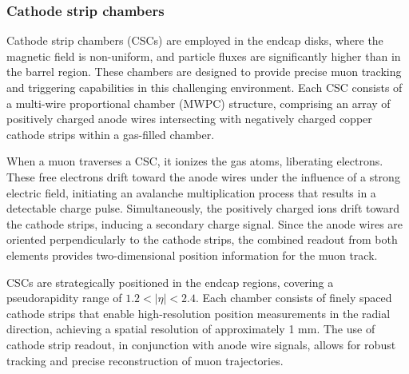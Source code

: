 
\subsubsection{Cathode strip chambers}

Cathode strip chambers (CSCs) are employed in the endcap disks, where the magnetic field is non-uniform, and particle fluxes are significantly higher than in the barrel region. These chambers are designed to provide precise muon tracking and triggering capabilities in this challenging environment. Each CSC consists of a multi-wire proportional chamber (MWPC) structure, comprising an array of positively charged anode wires intersecting with negatively charged copper cathode strips within a gas-filled chamber.

When a muon traverses a CSC, it ionizes the gas atoms, liberating electrons. These free electrons drift toward the anode wires under the influence of a strong electric field, initiating an avalanche multiplication process that results in a detectable charge pulse. Simultaneously, the positively charged ions drift toward the cathode strips, inducing a secondary charge signal. Since the anode wires are oriented perpendicularly to the cathode strips, the combined readout from both elements provides two-dimensional position information for the muon track.

CSCs are strategically positioned in the endcap regions, covering a pseudorapidity range of $1.2 < |\eta| < 2.4$. Each chamber consists of finely spaced cathode strips that enable high-resolution position measurements in the radial direction, achieving a spatial resolution of approximately 1 mm. The use of cathode strip readout, in conjunction with anode wire signals, allows for robust tracking and precise reconstruction of muon trajectories.

